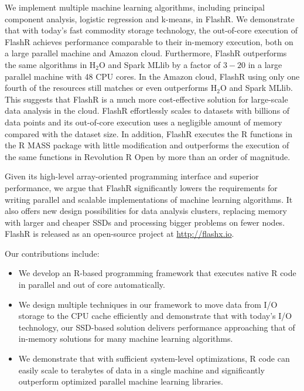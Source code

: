 
We implement multiple machine learning algorithms, including principal component
analysis, logistic regression and k-means, in FlashR. We demonstrate that
with today's fast commodity storage technology, the out-of-core execution of
FlashR achieves performance comparable to their in-memory execution, both
on a large parallel machine and Amazon cloud. Furthermore, FlashR outperforms
the same algorithms in H$_2$O \cite{h2o} and Spark MLlib \cite{spark} by a factor
of $3-20$ in a large parallel machine with 48 CPU cores. In the Amazon cloud,
FlashR using only one fourth of the resources still matches or even outperforms
H$_2$O and Spark MLlib. This suggests that FlashR is a much
more cost-effective solution for large-scale data analysis in the cloud.
FlashR effortlessly scales to datasets with billions
of data points and its out-of-core execution uses a negligible amount of memory
compared with the dataset size. In addition, FlashR executes the R functions
in the R MASS \cite{mass} package with little modification and outperforms
the execution of the same functions in Revolution R Open \cite{rro} by more
than an order of magnitude.

Given its high-level array-oriented programming interface and superior performance,
we argue that FlashR significantly lowers the requirements for writing
parallel and scalable implementations of machine learning algorithms. It also
offers new design possibilities for data analysis clusters, replacing memory
with larger and cheaper SSDs and processing bigger problems on fewer nodes.
FlashR is released as an open-source project at \href{http://flashx.io}{http://flashx.io}.

Our contributions include:
\begin{itemize}
\item We develop an R-based programming framework that executes native R code
in parallel and out of core automatically.
\item We design multiple techniques in our framework to move data from
I/O storage to the CPU cache efficiently and demonstrate that with today's I/O
technology, our SSD-based solution delivers performance approaching that of
in-memory solutions for many machine learning algorithms.
\item We demonstrate that with sufficient system-level optimizations, R code
can easily scale to terabytes of data in a single machine and significantly
outperform optimized parallel machine learning libraries.
\end{itemize}

